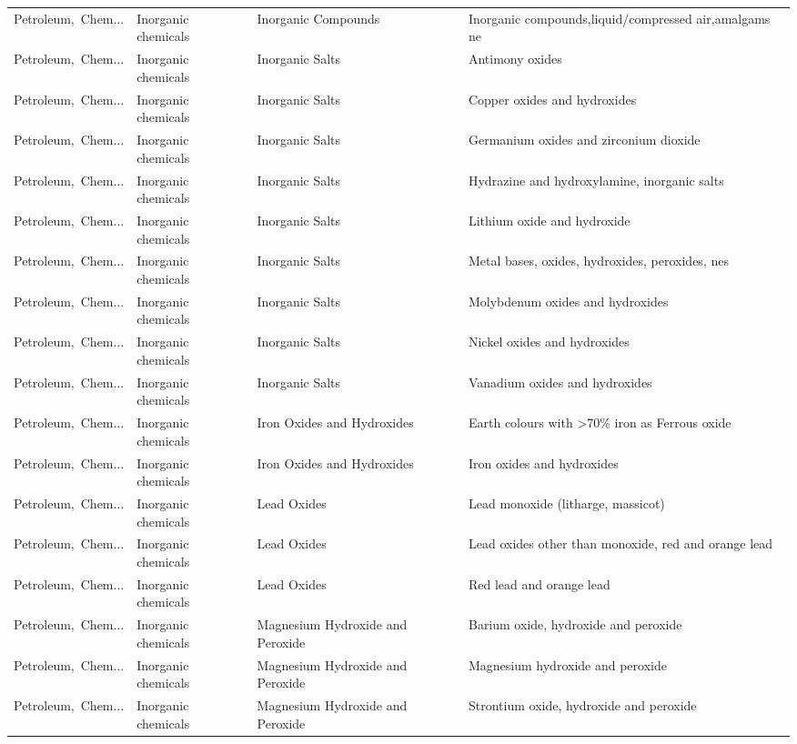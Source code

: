 \begin{appendices}
\begin{xltabular}{\textwidth}{|p{0.10\textwidth}|p{0.25\textwidth}|p{0.24\textwidth}|p{0.31\textwidth}|}
Petroleum,\ Chem... & Inorganic chemicals & Inorganic Compounds & Inorganic compounds,liquid/compressed air,amalgams ne \\
Petroleum,\ Chem... & Inorganic chemicals & Inorganic Salts & Antimony oxides \\
Petroleum,\ Chem... & Inorganic chemicals & Inorganic Salts & Copper oxides and hydroxides \\
Petroleum,\ Chem... & Inorganic chemicals & Inorganic Salts & Germanium oxides and zirconium dioxide \\
Petroleum,\ Chem... & Inorganic chemicals & Inorganic Salts & Hydrazine and hydroxylamine, inorganic salts \\
Petroleum,\ Chem... & Inorganic chemicals & Inorganic Salts & Lithium oxide and hydroxide \\
Petroleum,\ Chem... & Inorganic chemicals & Inorganic Salts & Metal bases, oxides, hydroxides, peroxides, nes \\
Petroleum,\ Chem... & Inorganic chemicals & Inorganic Salts & Molybdenum oxides and hydroxides \\
Petroleum,\ Chem... & Inorganic chemicals & Inorganic Salts & Nickel oxides and hydroxides \\
Petroleum,\ Chem... & Inorganic chemicals & Inorganic Salts & Vanadium oxides and hydroxides \\
Petroleum,\ Chem... & Inorganic chemicals & Iron Oxides and Hydroxides & Earth colours with >70\% iron as Ferrous oxide \\
Petroleum,\ Chem... & Inorganic chemicals & Iron Oxides and Hydroxides & Iron oxides and hydroxides \\
Petroleum,\ Chem... & Inorganic chemicals & Lead Oxides & Lead monoxide (litharge, massicot) \\
Petroleum,\ Chem... & Inorganic chemicals & Lead Oxides & Lead oxides other than monoxide, red and orange lead \\
Petroleum,\ Chem... & Inorganic chemicals & Lead Oxides & Red lead and orange lead \\
Petroleum,\ Chem... & Inorganic chemicals & Magnesium Hydroxide and Peroxide & Barium oxide, hydroxide and peroxide \\
Petroleum,\ Chem... & Inorganic chemicals & Magnesium Hydroxide and Peroxide & Magnesium hydroxide and peroxide \\
Petroleum,\ Chem... & Inorganic chemicals & Magnesium Hydroxide and Peroxide & Strontium oxide, hydroxide and peroxide \\

\end{xltabular}
\end{appendices}
